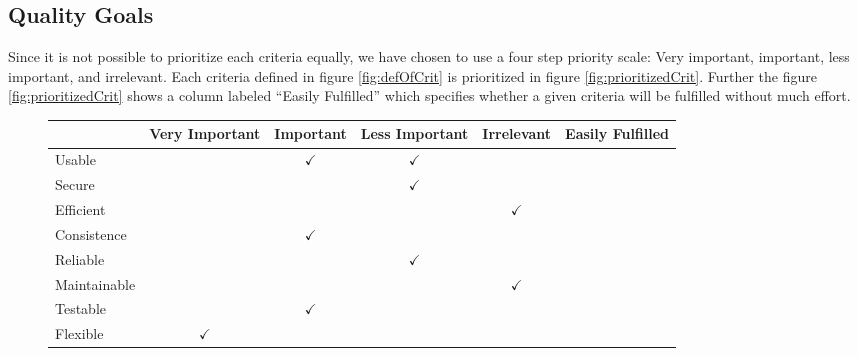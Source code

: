 \subsection{Quality Goals}
Since it is not possible to prioritize each criteria equally, we have chosen to use a four step priority scale: Very important, important, less important, and irrelevant.
Each criteria defined in figure \ref{fig:defOfCrit} is prioritized in figure \ref{fig:prioritizedCrit}.
Further the figure \ref{fig:prioritizedCrit} shows a column labeled ``Easily Fulfilled''
which specifies whether a given criteria will be fulfilled without much effort.

\begin{figure}[htbp]
	\centering
		\begin{tabular}{| l | m{} | m{}| m{}| m{}|m{}|} \hline
												& Very  Important 												& Important 														& Less Important 											& Irrelevant 												& Easily Fulfilled 									\\ \hline
		Usable  						& 																				& \multicolumn{1}{c|}{$\checkmark$}			& \multicolumn{1}{c|}{$\checkmark$}		& 																	& 																	\\ \hline
		Secure  						& 																				& 																			& \multicolumn{1}{c|}{$\checkmark$} 	& 																	& 																	\\ \hline
		Efficient 					& 																				& 																			& 																		& \multicolumn{1}{c|}{$\checkmark$} & 																	\\ \hline
		Consistence  				& 																				& \multicolumn{1}{c|}{$\checkmark$} 		& 																		& 																	& 																	\\ \hline
		Reliable  					& 																				& 																			& \multicolumn{1}{c|}{$\checkmark$} 	& 																	& 																	\\ \hline
		Maintainable  			& 																				& 																			& 																		& \multicolumn{1}{c|}{$\checkmark$} & 																	\\ \hline
		Testable  					& 																				& \multicolumn{1}{c|}{$\checkmark$} 		& 																		& 																	& 																	\\ \hline
		Flexible  					& \multicolumn{1}{c|}{$\checkmark$} 			& 																			& 																		& 																	& 																	\\ \hline

\end{tabular}
\end{figure}
